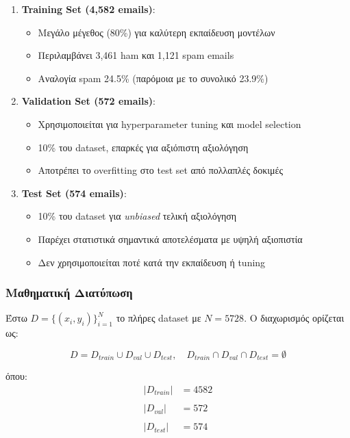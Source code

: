 \documentclass[12pt,a4paper,twoside]{book}
\begin{document}
\begin{enumerate}
    \item \textbf{Training Set (4,582 emails)}:
          \begin{itemize}
              \item Μεγάλο μέγεθος (80\%) για καλύτερη εκπαίδευση μοντέλων
              \item Περιλαμβάνει 3,461 ham και 1,121 spam emails
              \item Αναλογία spam 24.5\% (παρόμοια με το συνολικό 23.9\%)
          \end{itemize}

    \item \textbf{Validation Set (572 emails)}:
          \begin{itemize}
              \item Χρησιμοποιείται για hyperparameter tuning και model selection
              \item 10\% του dataset, επαρκές για αξιόπιστη αξιολόγηση
              \item Αποτρέπει το overfitting στο test set από πολλαπλές δοκιμές
          \end{itemize}

    \item \textbf{Test Set (574 emails)}:
          \begin{itemize}
              \item 10\% του dataset για \textit{unbiased} τελική αξιολόγηση
              \item Παρέχει στατιστικά σημαντικά αποτελέσματα με υψηλή αξιοπιστία
              \item Δεν χρησιμοποιείται ποτέ κατά την εκπαίδευση ή tuning
          \end{itemize}
\end{enumerate}

\subsubsection*{Μαθηματική Διατύπωση}

Έστω \(D = \{(x_i, y_i)\}_{i=1}^{N}\) το πλήρες dataset με \(N = 5728\). Ο διαχωρισμός ορίζεται ως:

\begin{equation}
    D = D_{train} \cup D_{val} \cup D_{test}, \quad D_{train} \cap D_{val} \cap D_{test} = \emptyset
\end{equation}

όπου:
\begin{align}
    |D_{train}| & = 4582 \\\\
    |D_{val}|   & = 572  \\\\
    |D_{test}|  & = 574
\end{align}
\end{document}
